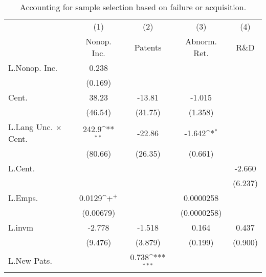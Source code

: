 \begin{table}
\begin{center}
\caption[Sample Selection on Exit]{Accounting for sample selection based on failure or acquisition.\label{sel3}}
\vspace{0.3in}
{
\def\sym#1{\ifmmode^{#1}\else\(^{#1}\)\fi}
\begin{tabular}{l*{4}{c}}
\hline\hline
                    &\multicolumn{1}{c}{(1)}&\multicolumn{1}{c}{(2)}&\multicolumn{1}{c}{(3)}&\multicolumn{1}{c}{(4)}\\
                    &\multicolumn{1}{c}{Nonop. Inc.}&\multicolumn{1}{c}{Patents}&\multicolumn{1}{c}{Abnorm. Ret.}&\multicolumn{1}{c}{R\&D}\\
\hline
L.Nonop. Inc.       &       0.238         &                     &                     &                     \\
                    &     (0.169)         &                     &                     &                     \\
Cent.               &       38.23         &      -13.81         &      -1.015         &                     \\
                    &     (46.54)         &     (31.75)         &     (1.358)         &                     \\
L.Lang Unc. $\times$ Cent.&       242.9\sym{**} &      -22.86         &      -1.642\sym{*}  &                     \\
                    &     (80.66)         &     (26.35)         &     (0.661)         &                     \\
L.Cent.             &                     &                     &                     &      -2.660         \\
                    &                     &                     &                     &     (6.237)         \\
L.Emps.             &      0.0129\sym{+}  &                     &   0.0000258         &                     \\
                    &   (0.00679)         &                     & (0.0000258)         &                     \\
L.invm              &      -2.778         &      -1.518         &       0.164         &       0.437         \\
                    &     (9.476)         &     (3.879)         &     (0.199)         &     (0.900)         \\
L.New Pats.         &                     &       0.738\sym{***}&                     &                     \\

\end{tabular}}
\end{center}
\end{table}

